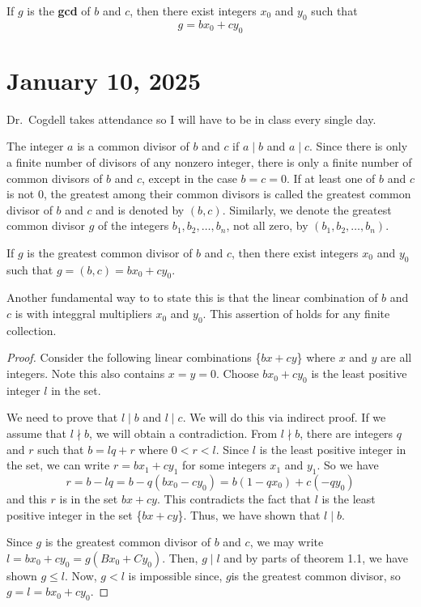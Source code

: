 \documentclass[11pt]{article}
\begin{document}
\begin{theorem}
    If $g$ is the \textbf{gcd} of \( b \) and \( c \), then there exist integers \( x_0 \) and \( y_0 \) such that \[g = bx_0 + cy_0\]
\end{theorem}

\section{January 10, 2025}
Dr.\ Cogdell takes attendance so I will have to be in class every single day.

\begin{definition}
    The integer $a$ is a common divisor of $b$ and $c$ if $a \mid b$ and $a \mid c$. Since there is only a finite number of divisors of any nonzero integer, there is only a finite number of common divisors of $b$ and $c$, except in the case $b = c = 0$. If at least one of $b$ and $c$ is not $0$, the greatest among their common divisors is called the greatest common divisor of $b$ and $c$ and is denoted by $(b, c)$. Similarly, we denote the greatest common divisor $g$ of the integers $b_1, b_2, \ldots, b_n$, not all zero, by $(b_1, b_2, \ldots, b_n)$.
\end{definition}

\begin{theorem}
    If $g$ is the greatest common divisor of $b$ and $c$, then there exist integers $x_0$ and $y_0$ such that $g = (b, c) = bx_0 + cy_0$.
\end{theorem}

\begin{fact}
    Another fundamental way to to state this is that the linear combination of \( b \) and \( c \) is with integgral multipliers \( x_0 \) and \( y_0 \). This assertion of holds for any finite collection.
\end{fact}
\begin{proof}
    Consider the following linear combinations \{\(bx + cy\)\} where \(x\) and \(y\) are all integers. Note this also contains \(x = y = 0\). Choose \(bx_0 + cy_0 \) is the least positive integer \(l\) in the set.

    We need to prove that \(l \mid b\) and \(l \mid c\). We will do this via
    indirect proof. If we assume that \(l \nmid b\), we will obtain a
    contradiction. From \(l \nmid b\), there are integers \(q\) and \(r\) such that
    \(b = lq + r\) where \(0 < r < l\). Since \(l\) is the least positive integer
    in the set, we can write \(r = bx_1 + cy_1\) for some integers \(x_1\) and
    \(y_1\). So we have \[r = b - lq = b - q(bx_0 - cy_0) = b(1 - qx_0) + c(-qy_0)\]  and this \(r\) is in the set {\(bx + cy\)}. This contradicts the fact that
    \(l\) is the least positive integer in the set \{\(bx + cy\)\}. Thus, we have
    shown that \(l \mid b\).

    Since \(g\) is the greatest common divisor of \(b\) and \(c\), we may write \(l
    = bx_0 + cy_0 = g(Bx_0 + Cy_0)\). Then, \(g \mid l\) and by parts of theorem
    1.1, we have shown \(g \leq l\). Now, \(g < l\) is impossible since, \(g\)is
    the greatest common divisor, so \(g = l = bx_0 + cy_0\).
\end{proof}
\end{document}
